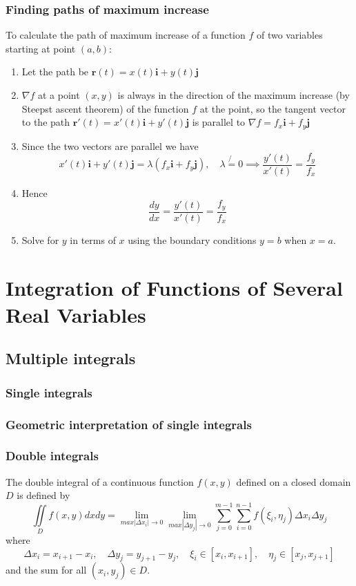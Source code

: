 \documentclass[12pt]{article}
\begin{document}
		\subsubsection{Finding paths of maximum increase}
		To calculate the path of maximum increase of a function $f$ of two variables starting at point $(a,b)$:
		\begin{enumerate}
			\item Let the path be $\mathbf{r}(t) = x(t)\mathbf{i} + y(t)\mathbf{j}$
			\item $\nabla f$ at a point $(x,y)$ is always in the direction of the maximum increase (by Steepst ascent theorem) of the function $f$ at the point,
					so the tangent vector to the path  $\mathbf{r}'(t) = x'(t)\mathbf{i} + y'(t)\mathbf{j}$ is parallel to $\nabla f = f_x \mathbf{i} + f_y \mathbf{j}$
			\item Since the two vectors are parallel we have
					\[
						x'(t) \mathbf{i} + y'(t) \mathbf{j} = \lambda ( f_x \mathbf{i} + f_y \mathbf{j} ),  \quad \lambda \not{=} 0 \implies \frac{y'(t)}{x'(t)} = \frac{f_y}{f_x}
					\]
			\item Hence
					\[
						\frac{dy}{dx} = \frac{y'(t)}{x'(t)} = \frac{f_y}{f_x}
					\]
			\item Solve for $y$ in terms of $x$ using the boundary conditions $y=b$ when $x=a$.
		\end{enumerate}

\section{Integration of Functions of Several Real Variables}
	
	\subsection{Multiple integrals}
		\subsubsection{Single integrals}
		
		\subsubsection{Geometric interpretation of single integrals}
		
		\subsubsection{Double integrals}
		\begin{defn}
			The double integral of a continuous function $f(x,y)$ defined on a closed domain $D$ is defined by
			\[
				\iint\limits_D f(x,y) dxdy = \lim_{max|\Delta x_i| \to 0} \lim_{max|\Delta y_j| \to 0} \sum_{j=0}^{m-1} \sum_{i=0}^{n-1} f( \xi_i, \eta_j) \Delta x_i \Delta y_j
			\]
			where
			\[
				\Delta x_i = x_{i+1}- x_i, \quad \Delta y_j = y_{j+1}- y_j, \quad \xi_i \in [x_i, x_{i+1}], \quad \eta_j \in [x_j, x_{j+1}]
			\]
			and the sum for all $(x_i, y_j) \in D$.
		\end{defn}
		
\end{document}
